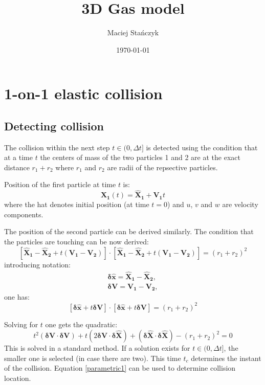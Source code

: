 \documentclass[10pt]{article}
\title{3D Gas model}
\author{Maciej Stańczyk}
\date{\today}
\begin{document}
\maketitle
\section{1-on-1 elastic collision}
\subsection{Detecting collision}
The collision within the next step $t\in(0,\Delta t]$ is detected using the condition that at a time $t$ the centers of mass of the two particles 1 and 2 are at the exact distance $r_1+r_2$ where $r_1$ and $r_2$ are radii of the repsective particles.

Position of the first particle at time $t$ is:
\begin{equation}\label{parametric1}
    \mathbf{X_1}(t) = \mathbf{\hat X_1} + \mathbf{V_1}t 
\end{equation}
where the hat denotes initial position (at time $t=0$) and $u$, $v$ and $w$ are velocity components.

The position of the second particle can be derived similarly. The condition that the particles are touching can be now derived:
$$
    \left[\mathbf{\hat X_1} -\mathbf{\hat X_2} + t(\mathbf{V_1} - \mathbf{V_2})\right]\cdot
    \left[\mathbf{\hat X_1} -\mathbf{\hat X_2} + t(\mathbf{V_1} - \mathbf{V_2})\right] = (r_1+r_2)^2
$$
introducing notation:
\begin{eqnarray*}
  \mathbf{\delta \hat x} = \mathbf{\hat X_1} - \mathbf{\hat X_2},\\
  \mathbf{\delta V} = \mathbf{V_1} - \mathbf{V_2},
\end{eqnarray*}
one has:
\begin{equation}
    \left[\mathbf{\delta \hat x} + t\mathbf{\delta V}\right]\cdot
    \left[\mathbf{\delta \hat x} + t\mathbf{\delta V}\right] = (r_1+r_2)^2
\end{equation}

Solving for $t$ one gets the quadratic:
\begin{equation}
 t^2(\mathbf{\delta V}\cdot\mathbf{\delta V})
 + t(2\mathbf{\delta V}\cdot\mathbf{\delta \hat X})
 + (\mathbf{\delta \hat X}\cdot\mathbf{\delta \hat X}) - (r_1+r_2)^2 
= 0
\end{equation}
This is solved in a standard method. If a solution exists for $t\in(0,\Delta t]$, the smaller one is selected (in case there are two). This time $t_c$ determines the instant of the collision. Equation \ref{parametric1} can be used to determine collision location.
\end{document}
